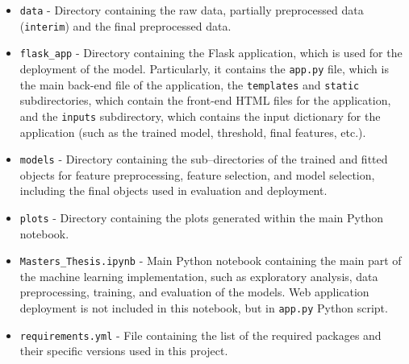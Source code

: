 \begin{itemize}\setlength\itemsep{0em}
    \item \texttt{data} - Directory containing the raw data, partially preprocessed data (\texttt{interim}) and the final preprocessed data.
    \item \texttt{flask\_app} - Directory containing the Flask application, which is used for the deployment of the model. Particularly, it contains the \texttt{app.py} file, which is the main back-end file of the application, the \texttt{templates} and \texttt{static} subdirectories, which contain the front-end HTML files for the application, and the \texttt{inputs} subdirectory, which contains the input dictionary for the application (such as the trained model, threshold, final features, etc.).
    \item \texttt{models} - Directory containing the sub--directories of the trained and fitted objects for feature preprocessing, feature selection, and model selection, including the final objects used in evaluation and deployment.
    \item \texttt{plots} - Directory containing the plots generated within the main Python notebook.
    \item \texttt{Masters\_Thesis.ipynb} - Main Python notebook containing the main part of the machine learning implementation, such as exploratory analysis, data preprocessing, training, and evaluation of the models. Web application deployment is not included in this notebook, but in \texttt{app.py} Python script.
    \item \texttt{requirements.yml} - File containing the list of the required packages and their specific versions used in this project.
\end{itemize}
    
    

